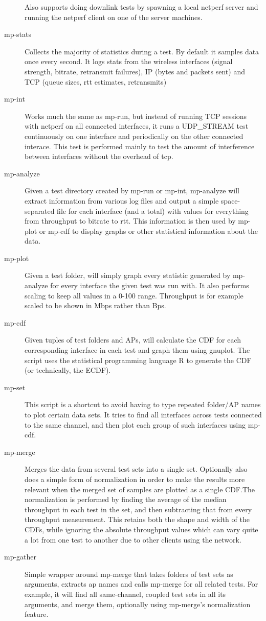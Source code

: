 \documentclass[12pt,a4paper]{article}
\begin{document}
\begin{description}
    Also supports doing downlink tests by spawning a local netperf server and
    running the netperf client on one of the server machines.
  \item[mp-stats]
    Collects the majority of statistics during a test. By default it samples
    data once every second. It logs stats from the wireless interfaces (signal
    strength, bitrate, retransmit failures), IP (bytes and packets sent) and TCP
    (queue sizes, rtt estimates, retransmits)
  \item[mp-int]
    Works much the same as mp-run, but instead of running TCP sessions with
    netperf on all connected interfaces, it runs a UDP\_STREAM test continuously
    on one interface and periodically on the other connected interace. This test
    is performed mainly to test the amount of interference between interfaces
    without the overhead of tcp.
  \item[mp-analyze]
    Given a test directory created by mp-run or mp-int, mp-analyze will extract
    information from various log files and output a simple space-separated file
    for each interface (and a total) with values for everything from throughput
    to bitrate to rtt. This information is then used by mp-plot or mp-cdf to
    display graphs or other statistical information about the data.
  \item[mp-plot]
    Given a test folder, will simply graph every statistic generated by
    mp-analyze for every interface the given test was run with. It also performs
    scaling to keep all values in a 0-100 range. Throughput is for example
    scaled to be shown in Mbps rather than Bps.
  \item[mp-cdf]
    Given tuples of test folders and APs, will calculate the CDF for each
    corresponding interface in each test and graph them using gnuplot. The
    script uses the statistical programming language R to generate the CDF (or
    technically, the ECDF).
  \item[mp-set]
    This script is a shortcut to avoid having to type repeated folder/AP
    names to plot certain data sets. It tries to find all interfaces across
    tests connected to the same channel, and then plot each group of such
    interfaces using mp-cdf.
  \item[mp-merge]
    Merges the data from several test sets into a single set. Optionally also
    does a simple form of normalization in order to make the results more
    relevant when the merged set of samples are plotted as a single CDF.\@ The
    normalization is performed by finding the average of the median throughput
    in each test in the set, and then subtracting that from every throughput
    measurement. This retains both the shape and width of the CDFs, while
    ignoring the absolute throughput values which can vary quite a lot from one
    test to another due to other clients using the network.
  \item[mp-gather]
    Simple wrapper around mp-merge that takes folders of test sets as arguments,
    extracts ap names and calls mp-merge for all related tests. For example, it
    will find all same-channel, coupled test sets in all its arguments, and
    merge them, optionally using mp-merge's normalization feature.
\end{description}
\end{document}
